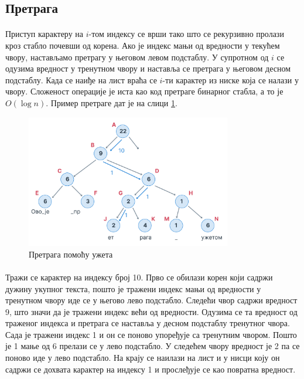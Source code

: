 \documentclass[12pt,oneside]{memoir}
\begin{document}
\subsection{Претрага}
\paragraph{}
Приступ карактеру на \(i\)-том  индексу се врши тако што се рекурзивно пролази кроз стабло 
почевши од корена. Ако је индекс мањи од вредности у текућем чвору, настављамо претрагу у његовом левом 
подстаблу. У супротном од \(i\) се одузима вредност у тренутном чвору и наставља се претрага у
његовом десном подстаблу. Када се наиђе на лист враћа се \(i\)-ти карактер из ниске која се налази
у чвору. Сложеност операције је иста као код претраге бинарног стабла, а то је \(O(\log{}n)\).
Пример претраге дат је на слици \ref{fig:rope_search}.

\begin{figure}
  \centering
  \includegraphics[width=0.8\textwidth]{images/rope_search_1.png}
  \caption{Претрага помоћу ужета}
  \label{fig:rope_search}
\end{figure}

\paragraph{}
Тражи се карактер на индексу број 10. Прво се обилази корен који садржи дужину укупног текста, 
пошто је тражени индекс мањи од вредности у тренутном чвору иде се у његово лево подстабло. Следећи чвор
садржи вредност 9, што значи да је тражени индекс већи од вредности. Одузима се та вредност од траженог
индекса и претрага се наставља у десном подстаблу тренутног чвора. Сада је тражени индекс 1 и он се
поново упоређује са тренутним чвором. Пошто је 1 мање од 6 прелази се у лево подстабло. 
У следећем чвору вредност је 2 па се поново иде у лево подстабло. 
На крају се наилази на лист и у нисци коју он садржи се дохвата карактер на индексу 1 
и прослеђује се као повратна вредност.
\end{document}

